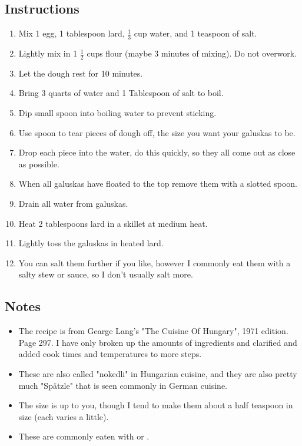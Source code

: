 \begin{multicols}{2}
\subsection*{Instructions}
\begin{enumerate}
    \item Mix 1 egg, 1 tablespoon lard, \( \frac{1}{3} \) cup water, and 1 teaspoon of salt.
    \item Lightly mix in 1 \( \frac{1}{2} \) cups flour (maybe 3 minutes of mixing). Do not overwork.
    \item Let the dough rest for 10 minutes.
    \item Bring 3 quarts of water and 1 Tablespoon of salt to boil.
    \item Dip small spoon into boiling water to prevent sticking.
    \item Use spoon to tear pieces of dough off, the size you want your galuskas to be.
    \item Drop each piece into the water, do this quickly, so they all come out as close as possible.
    \item When all galuskas have floated to the top remove them with a slotted spoon.
    \item Drain all water from galuskas.
    \item Heat 2 tablespoons lard in a skillet at medium heat.
    \item Lightly toss the galuskas in heated lard.
    \item You can salt them further if you like, however I commonly eat them with a salty stew or sauce, so I don't usually salt more.

\end{enumerate}

\subsection*{Notes}
\begin{itemize}
    \item The recipe is from Gearge Lang's "The Cuisine Of Hungary", 1971 edition. Page 297. I have only broken up the amounts of ingredients and clarified and added cook times and temperatures to more steps.
    \item These are also called "nokedli" in Hungarian cuisine, and they are also pretty much "Spätzle" that is seen commonly in German cuisine.
    \item The size is up to you, though I tend to make them about a half teaspoon in size (each varies a little).
    \item These are commonly eaten with  or .
\end{itemize}
\end{multicols}
\clearpage